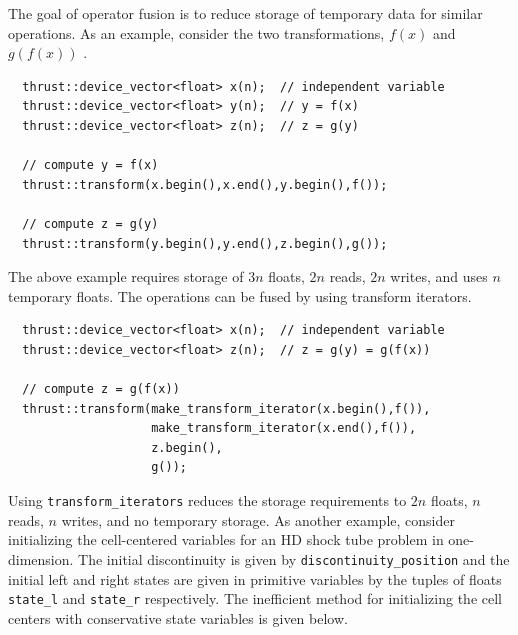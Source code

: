 The goal of operator fusion is to reduce storage of temporary data for similar operations.  As an example, consider the two transformations, $f(x)$ and $g(f(x))$ \citep{Thrust}.
\begin{lstlisting}
  thrust::device_vector<float> x(n);  // independent variable
  thrust::device_vector<float> y(n);  // y = f(x)
  thrust::device_vector<float> z(n);  // z = g(y)

  // compute y = f(x)
  thrust::transform(x.begin(),x.end(),y.begin(),f());

  // compute z = g(y) 
  thrust::transform(y.begin(),y.end(),z.begin(),g());
\end{lstlisting} 
The above example requires storage of $3n$ floats, $2n$ reads, $2n$ writes, and uses $n$ temporary floats.  The operations can be fused by using transform iterators.
\begin{lstlisting}
  thrust::device_vector<float> x(n);  // independent variable
  thrust::device_vector<float> z(n);  // z = g(y) = g(f(x))

  // compute z = g(f(x))
  thrust::transform(make_transform_iterator(x.begin(),f()),
                    make_transform_iterator(x.end(),f()),
                    z.begin(),
                    g());
\end{lstlisting} 
Using \verb+transform_iterators+ reduces the storage requirements to $2n$ floats, $n$ reads, $n$ writes, and no temporary storage.  As another example, consider initializing the cell-centered variables for an HD shock tube problem in one-dimension.  The initial discontinuity is given by \verb+discontinuity_position+ and the initial left and right states are given in primitive variables by the tuples of floats \verb+state_l+ and \verb+state_r+ respectively.  The inefficient method for initializing the cell centers with conservative state variables is given below.
